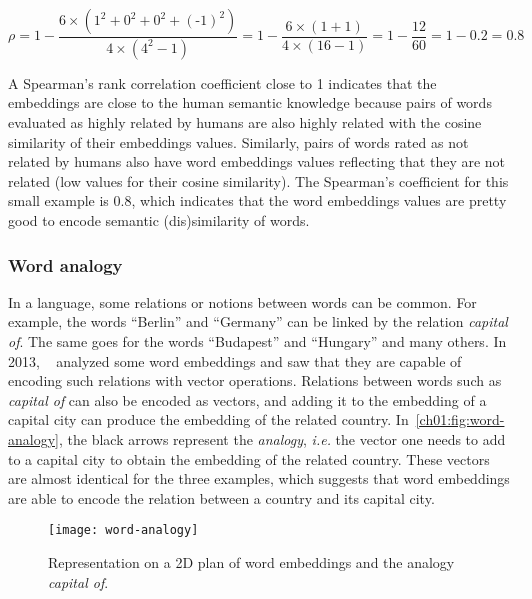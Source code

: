       \begin{equation*}
        \rho = 1 - \frac{6 \times (1^2 + 0^2 + 0^2 + (\text{-}1)^2)}
                        {4 \times (4^2 - 1)}
             = 1 - \frac{6 \times (1 + 1)}{4 \times (16 - 1)}
             = 1 - \frac{12}{60} = 1 - 0.2 = 0.8
      \end{equation*}

      A Spearman's rank correlation coefficient close to 1 indicates that the
      embeddings are close to the human semantic knowledge because pairs of
      words evaluated as highly related by humans are also highly related with
      the cosine similarity of their embeddings values. Similarly, pairs of
      words rated as not related by humans also have word embeddings values
      reflecting that they are not related (low values for their cosine
      similarity). The Spearman's coefficient for this small example is $0.8$,
      which indicates that the word embeddings values are pretty good to encode
      semantic (dis)similarity of words.

    \subsubsection{Word analogy}
      \label{ch01:subsubsec:word-analogy}
      In a language, some relations or notions between words can be common. For
      example, the words ``Berlin'' and ``Germany'' can be linked by the
      relation \textit{capital of}. The same goes for the words ``Budapest'' and
      ``Hungary'' and many others. In 2013,
      \citeauthor{mikolov2013efficient}~\citep{mikolov2013efficient} analyzed
      some word embeddings and saw that they are capable of encoding such
      relations with vector operations. Relations between words such as
      \textit{capital of} can also be encoded as vectors, and adding it
      to the embedding of a capital city can produce the embedding of the
      related country. In~\autoref{ch01:fig:word-analogy}, the black arrows
      represent the \textit{analogy}, \textit{i.e.} the vector one needs to add
      to a capital city to obtain the embedding of the related country. These
      vectors are almost identical for the three examples, which suggests that
      word embeddings are able to encode the relation between a country and its
      capital city.

      \begin{figure}[h!]
        \centering
        \texttt{[image: word-analogy]}
        \caption{Representation on a 2D plan of word embeddings and the
        analogy \textit{capital of}.}
        \label{ch01:fig:word-analogy}
      \end{figure}

